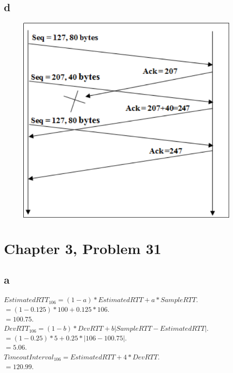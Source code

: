 \documentclass{article}
\begin{document}
\subsection*{d}

\begin{figure}[h!]
\centering
\includegraphics[scale=0.35]{P27.png}
\end{figure}

\clearpage

\section*{Chapter 3, Problem 31}
\subsection*{a}  $EstimatedRTT_{106} = (1-a)*EstimatedRTT + a * SampleRTT$.\\
\newline $= (1-0.125) * 100 + 0.125*106$.\\
\newline $= 100.75$.\\
\newline $DevRTT_{106} = (1-b) * DevRTT + b | SampleRTT -EstimatedRTT|$.\\
\newline $= (1-0.25) * 5 + 0.25 * |106-100.75|$.\\
\newline $= 5.06$.\\
\newline $TimeoutInterval_{106} = EstimatedRTT + 4 * DevRTT$.\\
\newline $= 120.99$.\\
\end{document}
